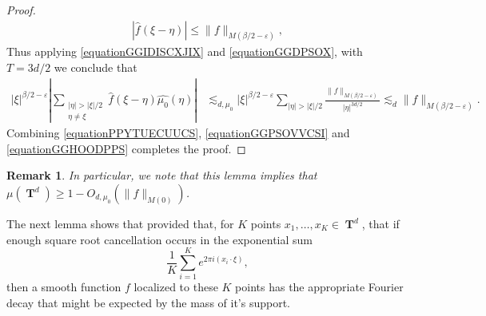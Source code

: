 \documentclass[12pt,reqno]{article}
\numberwithin{equation}{section}
\DeclareMathOperator{\TT}{\mathbf{T}}
\newtheorem{remark}{Remark}
\begin{document}
\begin{proof}
    \begin{equation} \label{equationGGDPSOX}
    \begin{split}
        |\widehat{f}(\xi - \eta)| \leq \| f \|_{M(\beta/2 - \varepsilon)},
    \end{split}
    \end{equation}
    Thus applying \eqref{equationGGIDISCXJIX} and \eqref{equationGGDPSOX}, with $T = 3d/2$ we conclude that
    \begin{equation} \label{equationGGHOODPPS}
    \begin{split}
        |\xi|^{\beta/2 - \varepsilon} \left| \sum_{\substack{|\eta| > |\xi|/2\\ \eta \neq \xi}} \widehat{f}(\xi - \eta) \widehat{\mu_0}(\eta) \right| &\lesssim_{d,\mu_0} |\xi|^{\beta/2 - \varepsilon} \sum_{|\eta| > |\xi|/2} \frac{\| f \|_{M(\beta/2 - \varepsilon)}}{|\eta|^{3d/2}} \lesssim_d \| f \|_{M(\beta/2 - \varepsilon)}.
    \end{split}
    \end{equation}
    Combining \eqref{equationPPYTUECUUCS}, \eqref{equationGGPSOVVCSI} and \eqref{equationGGHOODPPS} completes the proof.
\end{proof}

\begin{remark} \label{remarkFOIJIOSJCIOSJ}
    In particular, we note that this lemma implies that $\mu(\TT^d) \geq 1 - O_{d,\mu_0}(\| f \|_{M(0)})$.
\end{remark}

The next lemma shows that provided that, for $K$ points $x_1, \dots, x_K \in \TT^d$, that if enough square root cancellation occurs in the exponential sum
%
\[ \frac{1}{K} \sum_{i = 1}^K e^{2 \pi i (x_i \cdot \xi)}, \]
%
then a smooth function $f$ localized to these $K$ points has the appropriate Fourier decay that might be expected by the mass of it's support.
\end{document}
